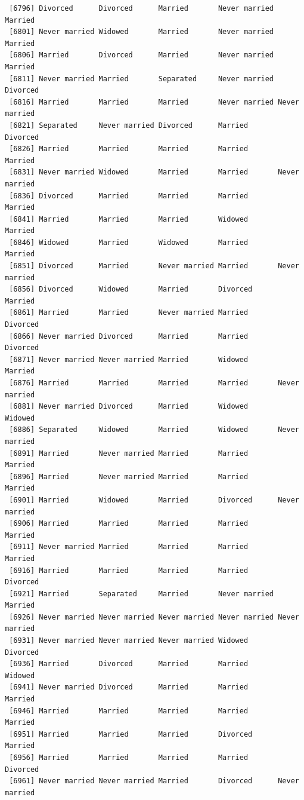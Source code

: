 \documentclass[
  letterpaper,
  DIV=11,
  numbers=noendperiod,
  oneside]{scrartcl}
\begin{document}
\begin{verbatim}
 [6796] Divorced      Divorced      Married       Never married Married      
 [6801] Never married Widowed       Married       Never married Married      
 [6806] Married       Divorced      Married       Never married Married      
 [6811] Never married Married       Separated     Never married Divorced     
 [6816] Married       Married       Married       Never married Never married
 [6821] Separated     Never married Divorced      Married       Divorced     
 [6826] Married       Married       Married       Married       Married      
 [6831] Never married Widowed       Married       Married       Never married
 [6836] Divorced      Married       Married       Married       Married      
 [6841] Married       Married       Married       Widowed       Married      
 [6846] Widowed       Married       Widowed       Married       Married      
 [6851] Divorced      Married       Never married Married       Never married
 [6856] Divorced      Widowed       Married       Divorced      Married      
 [6861] Married       Married       Never married Married       Divorced     
 [6866] Never married Divorced      Married       Married       Divorced     
 [6871] Never married Never married Married       Widowed       Married      
 [6876] Married       Married       Married       Married       Never married
 [6881] Never married Divorced      Married       Widowed       Widowed      
 [6886] Separated     Widowed       Married       Widowed       Never married
 [6891] Married       Never married Married       Married       Married      
 [6896] Married       Never married Married       Married       Married      
 [6901] Married       Widowed       Married       Divorced      Never married
 [6906] Married       Married       Married       Married       Married      
 [6911] Never married Married       Married       Married       Married      
 [6916] Married       Married       Married       Married       Divorced     
 [6921] Married       Separated     Married       Never married Married      
 [6926] Never married Never married Never married Never married Never married
 [6931] Never married Never married Never married Widowed       Divorced     
 [6936] Married       Divorced      Married       Married       Widowed      
 [6941] Never married Divorced      Married       Married       Married      
 [6946] Married       Married       Married       Married       Married      
 [6951] Married       Married       Married       Divorced      Married      
 [6956] Married       Married       Married       Married       Divorced     
 [6961] Never married Never married Married       Divorced      Never married

\end{verbatim}
\end{document}

